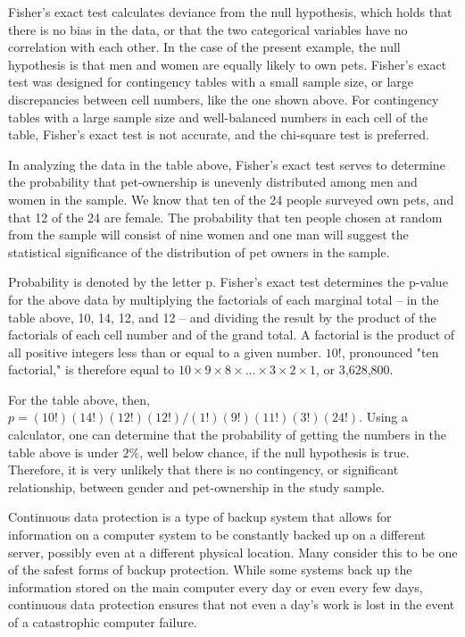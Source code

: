 Fisher's exact test calculates deviance from the null hypothesis, which holds that there is no bias in the data, or that the two categorical variables have no correlation with each other. In the case of the present example, the null hypothesis is that men and women are equally likely to own pets. Fisher's exact test was designed for contingency tables with a small sample size, or large discrepancies between cell numbers, like the one shown above. For contingency tables with a large sample size and well-balanced numbers in each cell of the table, Fisher's exact test is not accurate, and the chi-square test is preferred.

 

In analyzing the data in the table above, Fisher's exact test serves to determine the probability that pet-ownership is unevenly distributed among men and women in the sample. We know that ten of the 24 people surveyed own pets, and that 12 of the 24 are female. The probability that ten people chosen at random from the sample will consist of nine women and one man will suggest the statistical significance of the distribution of pet owners in the sample.

 

Probability is denoted by the letter p. Fisher's exact test determines the p-value for the above data by multiplying the factorials of each marginal total -- in the table above, 10, 14, 12, and 12 -- and dividing the result by the product of the factorials of each cell number and of the grand total. A factorial is the product of all positive integers less than or equal to a given number. $10!$, pronounced "ten factorial," is therefore equal to $10\times 9\times8 \times \ldots\times 3 \times 2 \times 1$, or 3,628,800.

 

For the table above, then, $p= (10!)(14!)(12!)(12!)/(1!)(9!)(11!)(3!)(24!)$. Using a calculator, one can determine that the probability of getting the numbers in the table above is under $2\%$, well below chance, if the null hypothesis is true. Therefore, it is very unlikely that there is no contingency, or significant relationship, between gender and pet-ownership in the study sample.

 



Continuous data protection is a type of backup system that allows for information on a computer system to be constantly backed up on a different server, possibly even at a different physical location. Many consider this to be one of the safest forms of backup protection. While some systems back up the information stored on the main computer every day or even every few days, continuous data protection ensures that not even a day's work is lost in the event of a catastrophic computer failure.

